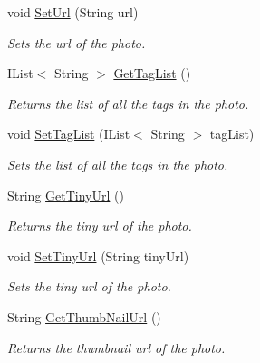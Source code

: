 \begin{DoxyCompactItemize}
void \hyperlink{classcom_1_1shephertz_1_1app42_1_1paas_1_1sdk_1_1csharp_1_1gallery_1_1_album_1_1_photo_aeccf26a1a7e8ae1f2d94b220dae56698}{Set\+Url} (String url)
\begin{DoxyCompactList}\small\item\em Sets the url of the photo. \end{DoxyCompactList}\item 
I\+List$<$ String $>$ \hyperlink{classcom_1_1shephertz_1_1app42_1_1paas_1_1sdk_1_1csharp_1_1gallery_1_1_album_1_1_photo_a993f898463a65df24cdbf87bf4c12c66}{Get\+Tag\+List} ()
\begin{DoxyCompactList}\small\item\em Returns the list of all the tags in the photo. \end{DoxyCompactList}\item 
void \hyperlink{classcom_1_1shephertz_1_1app42_1_1paas_1_1sdk_1_1csharp_1_1gallery_1_1_album_1_1_photo_a06706b9dcbfdc37513b3a621ee5253bc}{Set\+Tag\+List} (I\+List$<$ String $>$ tag\+List)
\begin{DoxyCompactList}\small\item\em Sets the list of all the tags in the photo. \end{DoxyCompactList}\item 
String \hyperlink{classcom_1_1shephertz_1_1app42_1_1paas_1_1sdk_1_1csharp_1_1gallery_1_1_album_1_1_photo_a2749b30cc29f58ac4b0d162cdd37470f}{Get\+Tiny\+Url} ()
\begin{DoxyCompactList}\small\item\em Returns the tiny url of the photo. \end{DoxyCompactList}\item 
void \hyperlink{classcom_1_1shephertz_1_1app42_1_1paas_1_1sdk_1_1csharp_1_1gallery_1_1_album_1_1_photo_a475f8535a3b513dbfb2068978a5c5f44}{Set\+Tiny\+Url} (String tiny\+Url)
\begin{DoxyCompactList}\small\item\em Sets the tiny url of the photo. \end{DoxyCompactList}\item 
String \hyperlink{classcom_1_1shephertz_1_1app42_1_1paas_1_1sdk_1_1csharp_1_1gallery_1_1_album_1_1_photo_aab4b47ae79093c515be7e7d9ee76cf00}{Get\+Thumb\+Nail\+Url} ()
\begin{DoxyCompactList}\small\item\em Returns the thumbnail url of the photo. \end{DoxyCompactList}\item 

\end{DoxyCompactItemize}
